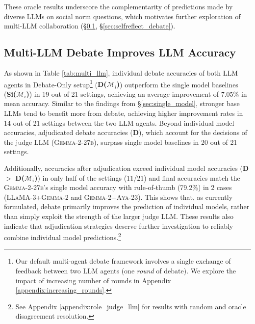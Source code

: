 
These oracle results underscore the  complementarity of predictions made by diverse LLMs on social norm questions, which motivates further exploration of multi-LLM collaboration  (\S \ref{sec:debate_only}, \S \ref{sec:selfreflect_debate}).


\subsection{Multi-LLM Debate Improves LLM Accuracy}
\label{sec:debate_only}

As shown in Table \ref{tab:multi_llm}, individual debate accuracies of both LLM agents in Debate-Only setup\footnote{Our default multi-agent debate framework involves a single exchange of feedback between two LLM agents (one \textit{round} of debate). We explore the impact of increasing number of rounds in Appendix \ref{appendix:increasing_rounds}.} (\textcolor{rred}{\textbf{D($\mathcal{M}_i$)}}) outperform the single model baselines (\textbf{Si($\mathcal{M}_i$)}) in 19 out of 21 settings, achieving an average improvement of 7.05\% in mean accuracy. Similar to the findings from \S \ref{sec:single_model}, stronger base LLMs tend to benefit more from debate, achieving higher improvement rates in 14 out of 21 settings between the two LLM agents. Beyond individual model accuracies, adjudicated debate accuracies (\textcolor{rred}{\textbf{D}}), which account for the decisions of the judge LLM (\textsc{Gemma-2-27b}), surpass single model baselines in 20 out of 21 settings.

Additionally, accuracies after adjudication exceed individual model accuracies (\textcolor{rred}{\textbf{D}} $>$ \textcolor{rred}{\textbf{D($\mathcal{M}_i$)}}) in only half of the settings (11/21) and final accuracies match the \textsc{Gemma-2-27b}'s single model accuracy with rule-of-thumb (79.2\%) in 2 cases (\textsc{LLaMA-3}+\textsc{Gemma-2} and \textsc{Gemma-2}+\textsc{Aya-23}). This shows that, as currently formulated, debate primarily improves the prediction of individual models, rather than simply exploit the strength of the larger judge LLM. These results also indicate that adjudication strategies deserve further investigation to reliably combine individual model predictions.\footnote{See Appendix \ref{appendix:role_judge_llm} for results with random and oracle disagreement resolution.}

